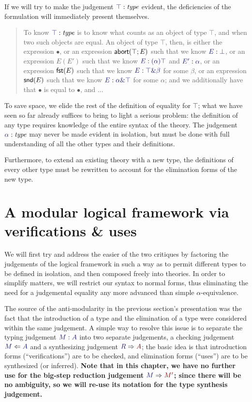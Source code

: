 \documentclass[main.tex]{subfiles}
\begin{document}
If we will try to make the judgement $\type\top$ evident, the deficiencies of
the formulation will immediately present themselves.

\begin{quote}
To know $\type\top$ is to know what counts as an object of type $\top$, and when
two such objects are equal. An object of type $\top$, then, is either the
expression $\bullet$, or an expression $\mathsf{abort}(\top;E)$ such that we know
$\ofty{E}{\bot}$, or an expression $E(E')$ such that we know $\ofty{E}{(\alpha)\top}$ and
$\ofty{E'}{\alpha}$, or an expression $\mathsf{fst}(E)$ such that we know $\ofty{E}{\product\top\beta}$
for some $\beta$, or an expression $\mathsf{snd}(E)$ such that we know
$\ofty{E}{\product\alpha\top}$ for some $\alpha$; and we additionally have that $\bullet$
is equal to $\bullet$, and ...
\end{quote}

To save space, we elide the rest of the definition of equality for $\top$; what
we have seen so far already suffices to bring to light a serious problem: the
definition of any type requires knowledge of the entire syntax of the theory.
The judgement $\type\alpha$ may never be made evident in isolation, but must be
done with full understanding of all the other types and their definitions.

Furthermore, to extend an existing theory with a new type, the definitions of
every other type must be rewritten to account for the elimination forms of the
new type.

\section{A modular logical framework via verifications \& uses}

We will first try and address the easier of the two critiques by
factoring the judgements of the logical framework in such a way as to
permit different types to be defined in isolation, and then composed
freely into theories. In order to simplify matters, we will restrict
our syntax to normal forms, thus eliminating the need for a
judgemental equality any more advanced than simple
$\alpha$-equivalence.

The source of the anti-modularity in the previous section's
presentation was the fact that the introduction of a type and the
elimination of a type were considered within the same judgement. A
simple way to resolve this issue is to separate the typing judgement
$\ofty{M}{A}$ into two separate judgements, a checking judgement
$\checks{M}{A}$ and a synthesizing judgement
$\infers{R}{A}$; the basic idea is that introduction forms
(``verifications'') are to be checked, and elimination forms
(``uses'') are to be synthesized (or inferred). \textbf{Note that in this
chapter, we have no further use for the big-step reduction judgement
$\reduce{M}{M'}$; since there will be no ambiguity, so we will re-use
its notation for the type synthesis judgement.}
\end{document}
